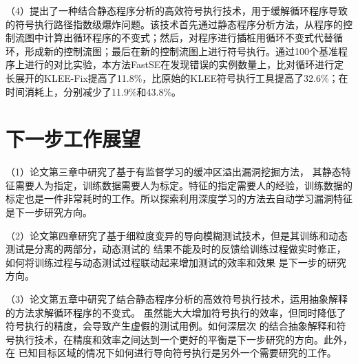 （4）提出了一种结合静态程序分析的高效符号执行技术，用于缓解循环程序导致的符号执行路径指数级爆炸问题。该技术首先通过静态程序分析方法，从程序的控制流图中计算出循环程序的不变式；然后，对程序进行插桩用循环不变式代替循环，形成新的控制流图；最后在新的控制流图上进行符号执行。通过100个基准程序上进行的对比实验，本方法FastSE在发现错误的实例数量上，比对循环进行定长展开的KLEE-Fix提高了11.8\%，比原始的KLEE符号执行工具提高了32.6\%；在时间消耗上，分别减少了11.9\%和43.8\%。


\section{下一步工作展望}

（1）论文第三章中研究了基于有监督学习的缓冲区溢出漏洞挖掘方法，
其静态特征需要人为指定，训练数据需要人为标定。特征的指定需要人的经验，训练数据的
标定也是一件非常耗时的工作。所以探索利用深度学习的方法去自动学习漏洞特征是下一步研究方向。

（2）论文第四章研究了基于细粒度变异的导向模糊测试技术，但是其训练和动态测试是分离的两部分，动态测试的
结果不能及时的反馈给训练过程做实时修正，如何将训练过程与动态测试过程联动起来增加测试的效率和效果
是下一步的研究方向。

（3）论文第五章中研究了结合静态程序分析的高效符号执行技术，运用抽象解释的方法求解循环程序的不变式。
虽然能大大增加符号执行的效率，但同时降低了符号执行的精度，会导致产生虚假的测试用例。如何深层次
的结合抽象解释和符号执行技术，在精度和效率之间达到一个更好的平衡是下一步研究的方向。此外，在
已知目标区域的情况下如何进行导向符号执行是另外一个需要研究的工作。
